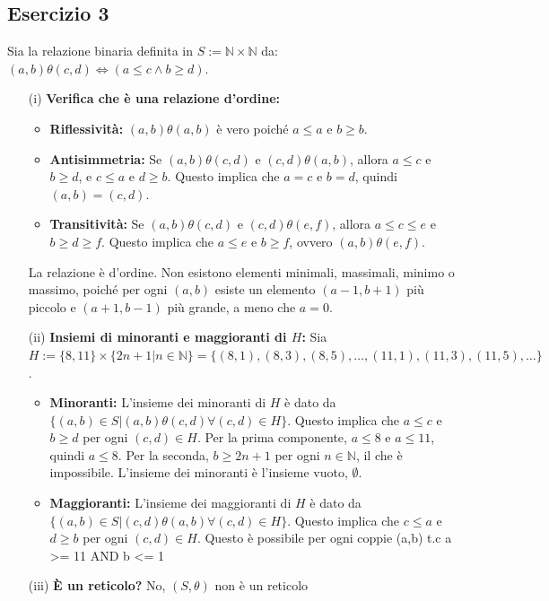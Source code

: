 \subsection*{Esercizio 3}
Sia la relazione binaria definita in $S:=\mathbb{N}\times\mathbb{N}$ da: $(a, b) \theta (c,d)\iff(a\le c\wedge b\ge d)$.
\begin{itemize}
    \item[(i)] \textbf{Verifica che è una relazione d'ordine:}
    \begin{itemize}
        \item \textbf{Riflessività:} $(a,b)\theta(a,b)$ è vero poiché $a\le a$ e $b\ge b$.
        \item \textbf{Antisimmetria:} Se $(a,b)\theta(c,d)$ e $(c,d)\theta(a,b)$, allora $a\le c$ e $b\ge d$, e $c\le a$ e $d\ge b$. Questo implica che $a=c$ e $b=d$, quindi $(a,b)=(c,d)$.
        \item \textbf{Transitività:} Se $(a,b)\theta(c,d)$ e $(c,d)\theta(e,f)$, allora $a\le c\le e$ e $b\ge d\ge f$. Questo implica che $a\le e$ e $b\ge f$, ovvero $(a,b)\theta(e,f)$.
    \end{itemize}
    La relazione è d'ordine. Non esistono elementi minimali, massimali, minimo o massimo, poiché per ogni $(a,b)$ esiste un elemento $(a-1, b+1)$ più piccolo e $(a+1, b-1)$ più grande, a meno che $a=0$.

    \item[(ii)] \textbf{Insiemi di minoranti e maggioranti di $H$:}
    Sia $H:=\{8,11\}\times\{2n+1|n\in\mathbb{N}\} = \{(8,1), (8,3), (8,5), \dots, (11,1), (11,3), (11,5), \dots\}$.
    \begin{itemize}
        \item \textbf{Minoranti:} L'insieme dei minoranti di $H$ è dato da $\{(a,b)\in S | (a,b)\theta(c,d) \forall (c,d)\in H\}$.
        Questo implica che $a\le c$ e $b\ge d$ per ogni $(c,d)\in H$. Per la prima componente, $a\le 8$ e $a\le 11$, quindi $a\le 8$. Per la seconda, $b\ge 2n+1$ per ogni $n\in\mathbb{N}$, il che è impossibile. L'insieme dei minoranti è l'insieme vuoto, $\emptyset$.
        \item \textbf{Maggioranti:} L'insieme dei maggioranti di $H$ è dato da $\{(a,b)\in S | (c,d)\theta(a,b) \forall (c,d)\in H\}$.
        Questo implica che $c\le a$ e $d\ge b$ per ogni $(c,d)\in H$. Questo è possibile per ogni coppie (a,b) t.c a >= 11 AND b <= 1
    \end{itemize}
    \item[(iii)] \textbf{È un reticolo?}
    No, $(S, \theta)$ non è un reticolo


\end{itemize}
